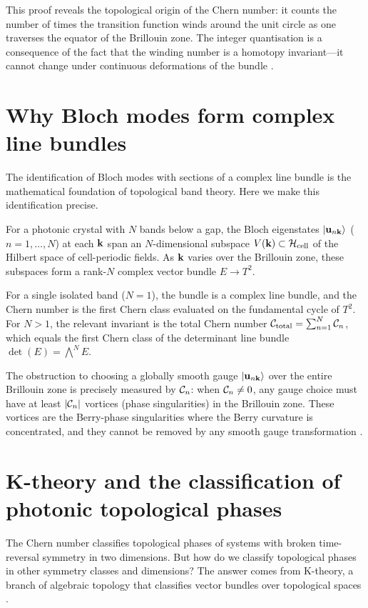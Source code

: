 This proof reveals the topological origin of the Chern number: it
counts the number of times the transition function winds around the
unit circle as one traverses the equator of the Brillouin zone.
The integer quantisation is a consequence of the fact that the
winding number is a homotopy invariant---it cannot change under
continuous deformations of the bundle \cite{ozawa2018topological,
asbth2016berry}.

\section{Why Bloch modes form complex line bundles}
\label{sec:appB-bloch-line-bundles}

The identification of Bloch modes with sections of a complex line
bundle is the mathematical foundation of topological band theory.
Here we make this identification precise.

For a photonic crystal with $N$ bands below a gap, the Bloch
eigenstates $|\mathbf{u}_{n\mathbf{k}}\rangle$ ($n=1,\ldots,N$) at each
$\mathbf{k}$ span an $N$-dimensional subspace $V(\mathbf{k})\subset
\mathcal{H}_{\mathrm{cell}}$ of the Hilbert space of cell-periodic
fields.  As $\mathbf{k}$ varies over the Brillouin zone, these subspaces
form a rank-$N$ complex vector bundle $E\to T^2$.

For a single isolated band ($N=1$), the bundle is a complex line
bundle, and the Chern number is the first Chern class evaluated on
the fundamental cycle of $T^2$.  For $N>1$, the relevant invariant
is the total Chern number $\mathcal{C}_{\mathrm{total}}=\sum_{n=1}^N
\mathcal{C}_n$, which equals the first Chern class of the determinant
line bundle $\det(E)=\bigwedge^N E$.

The obstruction to choosing a globally smooth gauge
$|\mathbf{u}_{n\mathbf{k}}\rangle$ over the entire Brillouin zone is
precisely measured by $\mathcal{C}_n$: when $\mathcal{C}_n\neq 0$, any gauge
choice must have at least $|\mathcal{C}_n|$ vortices (phase singularities)
in the Brillouin zone.  These vortices are the Berry-phase
singularities where the Berry curvature is concentrated, and they
cannot be removed by any smooth gauge transformation
\cite{gangaraj2016berry,web2026r}.


\section{K-theory and the classification of photonic topological phases}
\label{sec:appB-k-theory-photonic}

The Chern number classifies topological phases of systems with broken
time-reversal symmetry in two dimensions.  But how do we classify
topological phases in other symmetry classes and dimensions?  The
answer comes from K-theory, a branch of algebraic topology that
classifies vector bundles over topological spaces
\cite{asbth2016berry,ozawa2018topological}.

